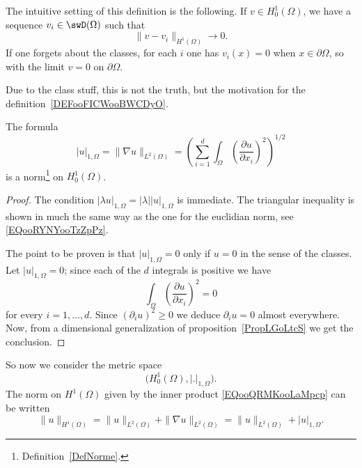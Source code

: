 \begin{normaltext}
    The intuitive setting of this definition is the following. If \( v\in H^1_0(\Omega)\), we have a sequence \( v_i\in \swD(\Omega)\) such that
    \begin{equation}
        \| v-v_i \|_{H^1(\Omega)}\to 0.
    \end{equation}
    If one forgets about the classes, for each \( i\) one has \( v_i(x)=0\) when \( x\in\partial\Omega\), so with the limit \( v=0\) on \( \partial\Omega\).

    Due to the class stuff, this is not the truth, but the motivation for the definition~\ref{DEFooFICWooBWCDyO}.
\end{normaltext}

\begin{lemma}
    The formula
    \begin{equation}
        | u |_{1,\Omega}=\| \nabla u \|_{L^2(\Omega)}=\left( \sum_{i=1}^d\int_{\Omega}\left( \frac{ \partial u }{ \partial x_i } \right)^2 \right)^{1/2}
    \end{equation}
    is a norm\footnote{Definition~\ref{DefNorme}.} on \( H_0^1(\Omega)\).
\end{lemma}

\begin{proof}
    The condition \( | \lambda u |_{1,\Omega}=| \lambda | | u |_{1,\Omega}\) is immediate. The triangular inequality is shown in much the same way as the one for the euclidian norm, see \eqref{EQooRYNYooTzZpPz}.

    The point to be proven is that \( | u |_{1,\Omega}=0\) only if \( u=0\) in the sense of the classes. Let \( | u |_{1,\Omega}=0\); since each of the \( d\) integrals is positive we have
    \begin{equation}
        \int_{\Omega}\left( \frac{ \partial u }{ \partial x_i } \right)^2=0
    \end{equation}
    for every \( i=1,\ldots, d\). Since \( (\partial_i u)^2\geq 0\) we deduce \( \partial_iu=0\) almost everywhere. Now, from a dimensional generalization of proposition~\ref{PropLGoLtcS} we get the conclusion.
\end{proof}

So now we consider the metric space
\begin{equation}
    \big( H^1_0(\Omega),| . |_{1,\Omega} \big).
\end{equation}
The norm on \( H^1(\Omega)\) given by the inner product \eqref{EQooQRMKooLaMpcp} can be written
\begin{equation}
    \| u \|_{H^1(\Omega)}=\| u \|_{L^2(\Omega)}+\| \nabla u \|_{L^2(\Omega)}=\| u \|_{L^2(\Omega)}+| u |_{1,\Omega}.
\end{equation}

